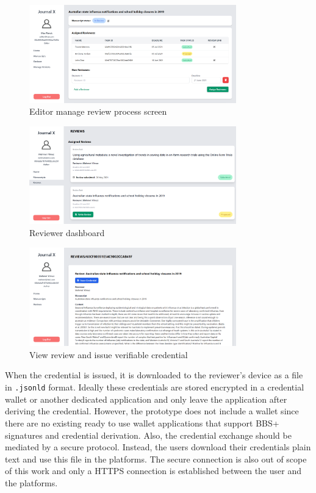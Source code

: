 \begin{figure}[htpb]
  \centering
  \includegraphics[width=0.8\textwidth]{figures/editor.png}
  \caption{Editor manage review process screen} \label{fig:editor}
\end{figure}

\begin{figure}[htpb]
  \centering
  \includegraphics[width=0.8\textwidth]{figures/reviewerScreen.png}
  \caption{Reviewer dashboard} \label{fig:reviewer-screen}
\end{figure}

\begin{figure}[htpb]
  \centering
  \includegraphics[width=0.8\textwidth]{figures/viewReview.png}
  \caption{View review and issue verifiable credential} \label{fig:view-review}
\end{figure}

When the credential is issued, it is downloaded to the reviewer's device as a file in \lstinline{.jsonld} format. Ideally these credentials are stored encrypted in a credential wallet or another dedicated application and only leave the application after deriving the credential. However, the prototype does not include a wallet since there are no existing ready to use wallet applications that support BBS+ signatures and credential derivation. Also, the credential exchange should be mediated by a secure protocol.  Instead, the users download their credentials plain text and use this file in the platforms. The secure connection is also out of scope of this work and only a HTTPS connection is established between the user and the platforms.

